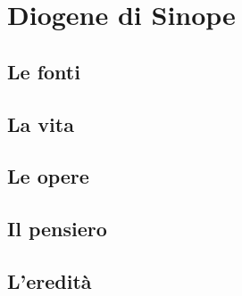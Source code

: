 \chapter{Diogene di Sinope}

\section{Le fonti}

\section{La vita}

\section{Le opere}

\section{Il pensiero}

\section{L'eredità}
